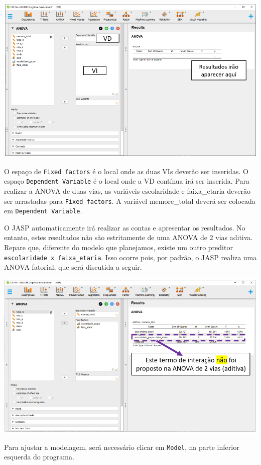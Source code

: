 \documentclass[
]{book}
\begin{document}
\includegraphics{./img/cap_anova_two_way_interface.png}

O espaço de \texttt{Fixed\ factors} é o local onde as duas VIs deverão
ser inseridas. O espaço \texttt{Dependent\ Variable} é o local onde a VD
contínua irá ser inserida. Para realizar a ANOVA de duas vias, as
variáveis escolaridade e faixa\_etaria deverão ser arrastadas para
\texttt{Fixed\ factors}. A variável memore\_total deverá ser colocada em
\texttt{Dependent\ Variable}.

O JASP automaticamente irá realizar as contas e apresentar os
resultados. No entanto, estes resultados não são estritamente de uma
ANOVA de 2 vias aditiva. Repare que, diferente do modelo que planejamos,
existe um outro preditor \texttt{escolaridade\ x\ faixa\_etaria}. Isso
ocorre pois, por padrão, o JASP realiza uma ANOVA fatorial, que será
discutida a seguir.

\includegraphics{./img/cap_anova_two_way_execucao.png}

Para ajustar a modelagem, será necessário clicar em \texttt{Model}, na
parte inferior esquerda do programa.
\end{document}
